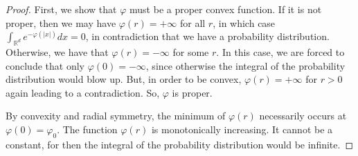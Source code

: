 \documentclass{amsart}
\theoremstyle{lemma}
\theoremstyle{remark}
\begin{document}
\begin{proof} First, we show that $\varphi$ must be a proper convex function. If it is not proper, then we may have $\varphi(r) = +\infty$ for all $r$, in which case $\int_{\mathbb{R}^d} e^{-\varphi(\vert x \vert)}dx = 0$, in contradiction that we have a probability distribution. Otherwise, we have that $\varphi(r) = -\infty$ for some $r$. In this case, we are forced to conclude that only $\varphi(0) = -\infty$, since otherwise the integral of the probability distribution would blow up. But, in order to be convex, $\varphi(r) = + \infty$ for $r>0$ again leading to a contradiction. So, $\varphi$ is proper.

By convexity and radial symmetry, the minimum of $\varphi(r)$ necessarily occurs at $\varphi(0) = \varphi_0$. The function $\varphi(r)$ is monotonically increasing. It cannot be a constant, for then the integral of the probability distribution would be infinite.


\end{proof}
\end{document}

